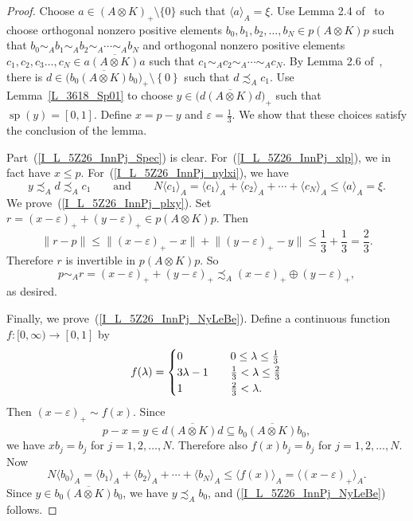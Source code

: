 \documentclass[10pt]{amsart}
\numberwithin{equation}{section}
\theoremstyle{definition}
\newcommand{\ep}{\varepsilon}
\newcommand{\ld}{\lambda}
\newcommand{\spec}{{\operatorname{sp}}}
\newcommand{\andeqn}{\qquad {\mbox{and}} \qquad}
\newcommand{\cfn}{continuous function}
\renewcommand{\S}{\subseteq}
\newcommand{\I}{\infty}
\newcommand{\set}[1]{\left\{ #1 \right\}}
\newcommand{\cc}[1]{\langle #1 \rangle}
\begin{document}
\begin{proof}
Choose $a \in (A \otimes K)_{+} \setminus \{ 0 \}$
such that $\cc{a}_A = \xi$.
Use Lemma 2.4 of~\cite{Phl40} to choose
orthogonal nonzero positive elements
$b_0, b_1, b_2, \ldots, b_N \in p (A \otimes K) p$
such that $b_0 \sim_A b_1 \sim_A b_2 \sim_A \cdots \sim_A b_N$
and orthogonal nonzero positive elements
$c_1, c_2, c_3 \ldots, c_N \in {\overline{a (A \otimes K) a}}$
such that $c_1 \sim_A c_2 \sim_A \cdots \sim_A c_N$.
By Lemma 2.6 of~\cite{Phl40}, there is
$d \in
  \bigl( {\overline{b_0 (A \otimes K) b_0}} \bigr)_{+}
  \setminus \set{0}$
such that $d \precsim_A c_1$.
Use Lemma~\ref{L_3618_Sp01} to choose
$y \in \bigl( {\overline{d (A \otimes K) d}} \bigr)_{+}$
such that $\spec (y) = [0, 1]$.
Define $x = p - y$ and $\ep = \frac{1}{3}$.
We show that these choices satisfy the conclusion of the lemma.

Part~(\ref{I_L_5Z26_InnPj_Spec}) is clear.
For~(\ref{I_L_5Z26_InnPj_xlp}), we in fact have $x \leq p$.
For~(\ref{I_L_5Z26_InnPj_nylxi}), we have
\[
y \precsim_A d \precsim_A c_1
\andeqn
N \cc{c_1}_A = \cc{c_1}_A + \cc{c_2}_A + \cdots +
\cc{c_N}_A \leq \cc{a}_A = \xi.
\]
We prove~(\ref{I_L_5Z26_InnPj_plxy}).
Set $r = (x - \ep)_{+} + (y - \ep)_{+} \in p (A \otimes K) p$.
Then
\[
\| r - p \|
\leq \bigl\| (x - \ep)_{+} - x \bigr\|
  + \bigl\| (y - \ep)_{+} - y \bigr\|
\leq \frac{1}{3} + \frac{1}{3}
= \frac{2}{3}.
\]
Therefore $r$ is invertible in $p (A \otimes K) p$.
So
\[
p \sim_A r = (x - \ep)_{+} + (y - \ep)_{+}
\precsim_A (x - \ep)_{+} \oplus (y - \ep)_{+},
\]
as desired.

Finally, we prove~(\ref{I_L_5Z26_InnPj_NyLeBe}).
Define a \cfn{} $f \colon [0, \I) \to [0, 1]$ by
\[
f ( \ld) = \begin{cases}
0 & \hspace*{1em} 0 \leq \ld \leq \frac{1}{3} \\
3 \ld - 1 & \hspace*{1em} \frac{1}{3} < \ld \leq \frac{2}{3}\\
1 & \hspace*{1em} \frac{2}{3} < \ld.
\end{cases}
\]
Then $(x - \ep)_{+} \sim f (x)$.
Since
\[
p - x = y \in {\overline{d (A \otimes K) d}}
\S {\overline{b_0 (A \otimes K) b_0}},
\]
we have $x b_j = b_j$ for $j = 1, 2, \ldots, N$.
Therefore also $f (x) b_j = b_j$ for $j = 1, 2, \ldots, N$.
Now
\[
N \cc{b_0}_A = \cc{b_1}_A + \cc{b_2}_A + \cdots +
\cc{b_N}_A \leq \cc{f (x)}_A = \cc{(x - \ep)_{+}}_A.
\]
Since
$y \in {\overline{b_0 (A \otimes K) b_0}}$,
we have $y \precsim_A b_0$,
and (\ref{I_L_5Z26_InnPj_NyLeBe}) follows.
\end{proof}
\end{document}
